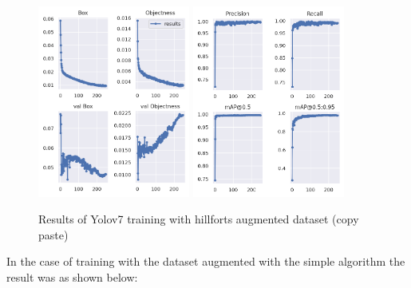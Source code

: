 \begin{figure}[H]
    \centering
    {{\includegraphics[width=5cm]{images/training/castros/aug1.png} }}
    \qquad
  {{\includegraphics[width=5cm]{images/training/castros/aug2.png} }}
    \caption{Results of Yolov7 training with hillforts augmented dataset (copy paste)}
    \label{fig:example}
\end{figure}

In the case of training with the dataset augmented with the simple algorithm the result was as shown below:

